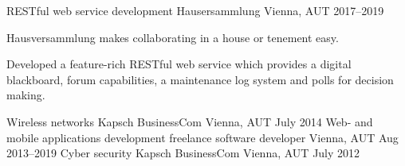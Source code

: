 \begin{cventries}
{\begin{cvitems}
	\end{cvitems}
}
\bigskip
\cventry
{RESTful web service development} %
{Hausersammlung} %
{Vienna, AUT} %
{2017--2019} %
{
	\begin{cvitems} %
		\item {Hausversammlung makes collaborating in a house or tenement easy.}
		\item {Developed a feature-rich RESTful web service which provides a digital blackboard, forum capabilities, a maintenance log system and polls for decision making.}
	\end{cvitems}
}
\bigskip
\cventry
{Wireless networks} %
{Kapsch BusinessCom} %
{Vienna, AUT} %
{July 2014} %
{}
\bigskip
\cventry
{Web- and mobile applications development} %
{freelance software developer} %
{Vienna, AUT} %
{Aug 2013--2019} %
{}
\bigskip
\cventry
{Cyber security} %
{Kapsch BusinessCom} %
{Vienna, AUT} %
{July 2012} %
{}

\end{cventries}
